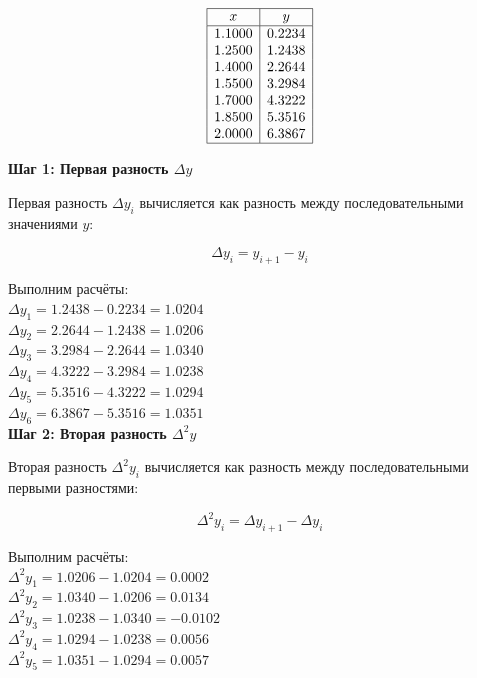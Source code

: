\documentclass{article}
\begin{document}
                  \[
                  \begin{array}{|c|c|}
                  \hline
                  x & y \\
                  \hline
                  1.1000 & 0.2234 \\
                  1.2500 & 1.2438 \\
                  1.4000 & 2.2644 \\
                  1.5500 & 3.2984 \\
                  1.7000 & 4.3222 \\
                  1.8500 & 5.3516 \\
                  2.0000 & 6.3867 \\
                  \hline
                  \end{array}
                  \]

                  \textbf{Шаг 1: Первая разность \(\Delta y\)}

                  Первая разность \(\Delta y_i\) вычисляется как разность между последовательными значениями \(y\):

                  \[
                  \Delta y_i = y_{i+1} - y_i
                  \]

                  Выполним расчёты:
                  \\
                  \(\Delta y_1 = 1.2438 - 0.2234 = 1.0204\) \\
                  \(\Delta y_2 = 2.2644 - 1.2438 = 1.0206\) \\
                  \(\Delta y_3 = 3.2984 - 2.2644 = 1.0340\) \\
                  \(\Delta y_4 = 4.3222 - 3.2984 = 1.0238\) \\
                  \(\Delta y_5 = 5.3516 - 4.3222 = 1.0294\) \\
                  \(\Delta y_6 = 6.3867 - 5.3516 = 1.0351\) \\

                  \textbf{Шаг 2: Вторая разность \(\Delta^2 y\)}

                  Вторая разность \(\Delta^2 y_i\) вычисляется как разность между последовательными первыми разностями:

                  \[
                  \Delta^2 y_i = \Delta y_{i+1} - \Delta y_i
                  \]

                  Выполним расчёты:
                  \\
                  \(\Delta^2 y_1 = 1.0206 - 1.0204 = 0.0002\) \\
                  \(\Delta^2 y_2 = 1.0340 - 1.0206 = 0.0134\) \\
                  \(\Delta^2 y_3 = 1.0238 - 1.0340 = -0.0102\) \\
                  \(\Delta^2 y_4 = 1.0294 - 1.0238 = 0.0056\) \\
                  \(\Delta^2 y_5 = 1.0351 - 1.0294 = 0.0057\) \\
\end{document}
